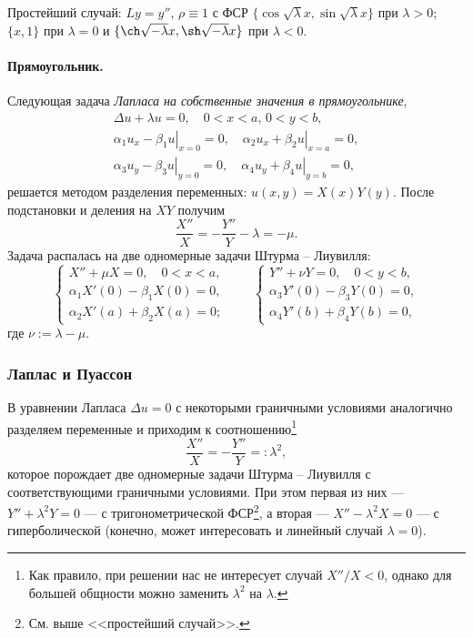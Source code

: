 Простейший случай: $ Ly = y'' $, $ \rho \equiv 1 $ с ФСР $
\{\cos\sqrt\lambda x, \sin\sqrt\lambda x\} $ при $ \lambda > 0 $; $ \{x, 1\} $
при $ \lambda = 0 $ и $ \{\ch\sqrt{-\lambda}x, \sh\sqrt{-\lambda}x\} $ при $
\lambda < 0 $.



\paragraph{Прямоугольник.}
Следующая задача \emph{Лапласа на собственные значения в прямоугольнике},  
\begin{gather*}
    \Delta u + \lambda u = 0, \quad 0 < x < a, \, 0 < y < b,\\
    \left.\alpha_1u_x - \beta_1u\right|_{x=0} = 0, \quad \left.\alpha_2u_x +
      \beta_2u\right|_{x=a} = 0,\\
      \left.\alpha_3 u_y - \beta_3u\right|_{y=0} = 0, \quad \left.\alpha_4u_y +
        \beta_4 u\right|_{y=b} = 0,
\end{gather*}
решается методом разделения переменных: $ u(x, y) = X(x)Y(y) $. После
подстановки и деления на $ XY $ получим 
\[
    \frac{X''}{X} = - \frac{Y''}{Y} - \lambda = -\mu.
\]
Задача распалась на две одномерные задачи Штурма -- Лиувилля: 
\[
  \begin{cases}
    X'' + \mu X = 0, \quad 0 < x < a,\\
    \alpha_1 X'(0) - \beta_1 X(0) = 0,\\
    \alpha_2 X'(a) + \beta_2 X(a) = 0;
  \end{cases} \qquad
  \begin{cases}
    Y'' + \nu Y = 0, \quad 0 < y < b,\\
    \alpha_3 Y'(0) - \beta_3 Y(0) = 0,\\
    \alpha_4 Y'(b) + \beta_4 Y(b) = 0,
  \end{cases}
\]
где $ \nu := \lambda - \mu $.

\subsubsection{Лаплас и Пуассон}
В уравнении Лапласа $ \Delta u = 0 $ с некоторыми граничными условиями
аналогично разделяем переменные и приходим к соотношению\footnote{Как правило,
  при решении нас не интересует случай $ X''/X < 0 $, однако для большей
  общности можно заменить $
\lambda^2 $ на $ \lambda $.}
\[
  \frac{X''}{X} = - \frac{Y''}{Y} =: \lambda^2,  
\]
которое порождает две одномерные задачи Штурма -- Лиувилля с соответствующими
граничными условиями. При этом первая из них --- $ Y'' + \lambda^2Y = 0 $ --- с
тригонометрической ФСР\footnote{См. выше <<простейший
случай>>.}, а вторая --- $ X'' - \lambda^2X = 0 $ --- с гиперболической (конечно,
может интересовать и линейный случай $ \lambda = 0 $).

